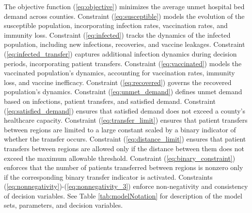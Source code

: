\documentclass{article}
\begin{document}
The objective function (\ref{eq:objective}) minimizes the average unmet hospital bed demand across counties. Constraint (\ref{eq:susceptible}) models the evolution of the susceptible population, incorporating infection rates, vaccination rates, and immunity loss. Constraint (\ref{eq:infected}) tracks the dynamics of the infected population, including new infections, recoveries, and vaccine leakages. Constraint (\ref{eq:infected_transfer}) captures additional infection dynamics during decision periods, incorporating patient transfers. Constraint (\ref{eq:vaccinated}) models the vaccinated population's dynamics, accounting for vaccination rates, immunity loss, and vaccine inefficacy. Constraint (\ref{eq:recovered}) governs the recovered population's dynamics. Constraint (\ref{eq:unmet_demand}) defines unmet demand based on infections, patient transfers, and satisfied demand. Constraint (\ref{eq:satisfied_demand}) ensures that satisfied demand does not exceed a county's healthcare capacity. Constraint (\ref{eq:transfer_limit}) ensures that patient transfers between regions are limited to a large constant scaled by a binary indicator of whether the transfer occurs. Constraint (\ref{eq:distance_limit}) ensures that patient transfers between regions are allowed only if the distance between them does not exceed the maximum allowable threshold. Constraint (\ref{eq:binary_constraint}) enforces that the number of patients transferred between regions is nonzero only if the corresponding binary transfer indicator is activated. Constraints (\ref{eq:nonnegativity})-(\ref{eq:nonnegativity_3}) enforce non-negativity and consistency of decision variables. See Table \ref{tab:modelNotation} for description of the model sets, parameters, and decision variables. 
\end{document}
